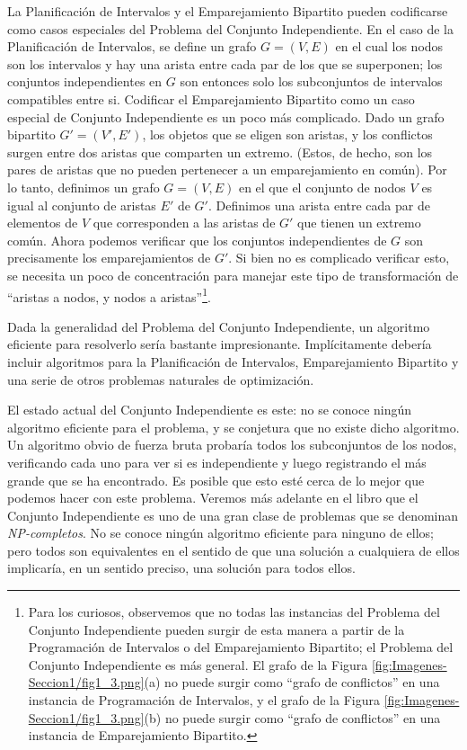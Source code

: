 \documentclass[a4paper, 12pt]{book}
\theoremstyle{dotless}
\begin{document}
La Planificación de Intervalos y el Emparejamiento Bipartito pueden codificarse como casos especiales del Problema del Conjunto Independiente. En el caso de la Planificación de Intervalos, se define un grafo $G=(V,E)$ en el cual los nodos son los intervalos y hay una arista entre cada par de los que se superponen; los conjuntos independientes en $G$ son entonces solo los subconjuntos de intervalos compatibles entre si. Codificar el Emparejamiento Bipartito como un caso especial de Conjunto Independiente es un poco más complicado. Dado un grafo bipartito $G'=(V',E')$, los objetos que se eligen son aristas, y los conflictos surgen entre dos aristas que comparten un extremo. (Estos, de hecho, son los pares de aristas que no pueden pertenecer a un emparejamiento en común). Por lo tanto, definimos un grafo $G=(V,E)$ en el que el conjunto de nodos $V$ es igual al conjunto de aristas $E'$ de $G'$. Definimos una arista entre cada par de elementos de $V$ que corresponden a las aristas de $G'$ que tienen un extremo común. Ahora podemos verificar que los conjuntos independientes de $G$ son precisamente los emparejamientos de $G'$. Si bien no es complicado verificar esto, se necesita un poco de concentración para manejar este tipo de transformación de ``aristas a nodos, y nodos a aristas''\footnote{Para los curiosos, observemos que no todas las instancias del Problema del Conjunto Independiente pueden surgir de esta manera a partir de la Programación de Intervalos o del Emparejamiento Bipartito; el Problema del Conjunto Independiente es más general. El grafo de la Figura \ref{fig:Imagenes-Seccion1/fig1_3.png}(a) no puede surgir como ``grafo de conflictos'' en una instancia de Programación de Intervalos, y el grafo de la Figura \ref{fig:Imagenes-Seccion1/fig1_3.png}(b) no puede surgir como ``grafo de conflictos'' en una instancia de Emparejamiento Bipartito.}.

Dada la generalidad del Problema del Conjunto Independiente, un algoritmo eficiente para resolverlo sería bastante impresionante. Implícitamente debería incluir algoritmos para la Planificación de Intervalos, Emparejamiento Bipartito y una serie de otros problemas naturales de optimización.

El estado actual del Conjunto Independiente es este: no se conoce ningún algoritmo eficiente para el problema, y se conjetura que no existe dicho algoritmo. Un algoritmo obvio de fuerza bruta probaría todos los subconjuntos de los nodos, verificando cada uno para ver si es independiente y luego registrando el más grande que se ha encontrado. Es posible que esto esté cerca de lo mejor que podemos hacer con este problema. Veremos más adelante en el libro que el Conjunto Independiente es uno de una gran clase de problemas que se denominan \textit{NP-completos}. No se conoce ningún algoritmo eficiente para ninguno de ellos; pero todos son equivalentes en el sentido de que una solución a cualquiera de ellos implicaría, en un sentido preciso, una solución para todos ellos.
\end{document}
